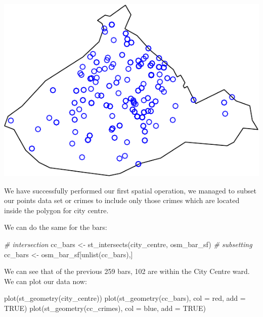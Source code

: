 \documentclass[
]{book}
\makeatletter
\newenvironment{Shaded}{\begin{snugshade}}{\end{snugshade}}
\newcommand{\AttributeTok}[1]{\textcolor[rgb]{0.61,0.61,0.61}{#1}}
\newcommand{\CommentTok}[1]{\textcolor[rgb]{0.37,0.37,0.37}{\textit{#1}}}
\newcommand{\ConstantTok}[1]{\textcolor[rgb]{0,0,0}{#1}}
\newcommand{\FunctionTok}[1]{\textcolor[rgb]{0,0,0}{#1}}
\newcommand{\NormalTok}[1]{#1}
\newcommand{\OtherTok}[1]{\textcolor[rgb]{0.37,0.37,0.37}{#1}}
\newcommand{\StringTok}[1]{\textcolor[rgb]{0.5,0.5,0.5}{#1}}
\newenvironment{kframe}{%
\medskip{}
\setlength{\fboxsep}{.8em}
 \def\at@end@of@kframe{}%
 \ifinner\ifhmode%
  \def\at@end@of@kframe{\end{minipage}}%
  \begin{minipage}{\columnwidth}%
 \fi\fi%
 \def\FrameCommand##1{\hskip\@totalleftmargin \hskip-\fboxsep
 \colorbox{shadecolor}{##1}\hskip-\fboxsep
     \hskip-\linewidth \hskip-\@totalleftmargin \hskip\columnwidth}%
 \MakeFramed {\advance\hsize-\width
   \@totalleftmargin\z@ \linewidth\hsize
   \@setminipage}}%
 {\par\unskip\endMakeFramed%
 \at@end@of@kframe}
\renewenvironment{Shaded}{\begin{kframe}}{\end{kframe}}
\makeatother
\begin{document}
\includegraphics{crime_mapping_files/figure-latex/plot_crimes_ccentre-1.pdf}

We have successfully performed our first spatial operation, we managed to subset our points data set or crimes to include only those crimes which are located inside the polygon for city centre.

We can do the same for the bars:

\begin{Shaded}
\begin{Highlighting}[]
\CommentTok{\# intersection}
\NormalTok{cc\_bars }\OtherTok{\textless{}{-}} \FunctionTok{st\_intersects}\NormalTok{(city\_centre, osm\_bar\_sf)}
\CommentTok{\# subsetting}
\NormalTok{cc\_bars }\OtherTok{\textless{}{-}}\NormalTok{ osm\_bar\_sf[}\FunctionTok{unlist}\NormalTok{(cc\_bars),]}
\end{Highlighting}
\end{Shaded}

We can see that of the previous 259 bars, 102 are within the City Centre ward. We can plot our data now:

\begin{Shaded}
\begin{Highlighting}[]
\FunctionTok{plot}\NormalTok{(}\FunctionTok{st\_geometry}\NormalTok{(city\_centre))}
\FunctionTok{plot}\NormalTok{(}\FunctionTok{st\_geometry}\NormalTok{(cc\_bars), }\AttributeTok{col =} \StringTok{\textquotesingle{}red\textquotesingle{}}\NormalTok{, }\AttributeTok{add =} \ConstantTok{TRUE}\NormalTok{)}
\FunctionTok{plot}\NormalTok{(}\FunctionTok{st\_geometry}\NormalTok{(cc\_crimes), }\AttributeTok{col =} \StringTok{\textquotesingle{}blue\textquotesingle{}}\NormalTok{, }\AttributeTok{add =} \ConstantTok{TRUE}\NormalTok{)}
\end{Highlighting}
\end{Shaded}
\end{document}

